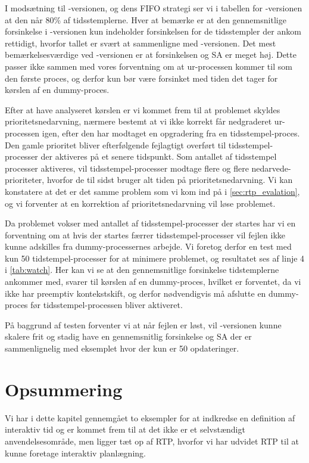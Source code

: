 I modsætning til -versionen, og dens FIFO strategi ser vi i tabellen for -versionen at den  når 80\% af tidsstemplerne. Hver at bemærke er at den gennemsnitlige forsinkelse i -versionen kun indeholder forsinkelsen for de tidsstempler der ankom rettidigt, hvorfor tallet er svært at sammenligne med -versionen. Det mest bemærkelsesværdige ved -versionen er at forsinkelsen og SA  er meget høj. Dette passer ikke sammen med vores forventning om at ur-processen kommer til som den første proces, og derfor kun bør være forsinket med tiden det tager for kørslen af en  dummy-proces.

Efter at have analyseret kørslen er vi kommet frem til at problemet skyldes prioritetsnedarvning, nærmere bestemt at vi ikke korrekt får nedgraderet ur-processen igen, efter den har modtaget en opgradering fra en tidsstempel-proces. Den gamle prioritet bliver efterfølgende fejlagtigt overført til tidsstempel-processer der aktiveres på et senere tidspunkt. Som antallet af tidsstempel processer aktiveres, vil tidsstempel-processer modtage flere og flere nedarvede-prioriteter, hvorfor de til sidst bruger alt tiden på prioritetsnedarvning.  Vi kan konstatere at det er det samme problem som vi kom ind på i \cref{sec:rtp_evalation}, og vi forventer at en korrektion af prioritetsnedarvning vil løse problemet. 

Da problemet vokser med antallet af tidsstempel-processer der startes har vi en forventning om at hvis der startes færrer tidsstempel-processer vil fejlen ikke kunne adskilles fra dummy-processernes arbejde. Vi foretog derfor en test med kun 50 tidstempel-processer for at minimere problemet, og resultatet ses af linje 4 i \cref{tab:watch}. Her kan vi se at  den gennemsnitlige forsinkelse tidstemplerne ankommer med, svarer til kørslen af en dummy-proces, hvilket er forventet, da vi ikke har preemptiv kontekstskift, og derfor nødvendigvis må afslutte en dummy-proces før tidsstempel-processen bliver aktiveret. 

På baggrund af testen forventer vi at når fejlen er løst, vil -versionen kunne skalere frit og stadig have en gennemsnitlig forsinkelse og SA der er sammenlignelig med eksemplet hvor der kun er 50 opdateringer.
\section{Opsummering}

Vi har i dette kapitel gennemgået to eksempler for at indkredse en definition af interaktiv tid og er kommet frem til at det ikke er et selvstændigt anvendelsesområde, men ligger tæt op af RTP, hvorfor vi har udvidet RTP til at kunne foretage interaktiv planlægning.

